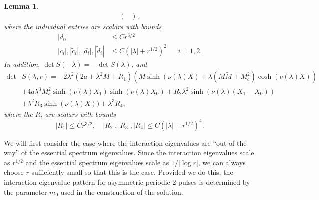 \documentclass[12pt]{elsarticle}
\theoremstyle{plain}
\newtheorem{lemma}[theorem]{Lemma}
\theoremstyle{definition}
\theoremstyle{remark}
\numberwithin{theorem}{section}
\numberwithin{equation}{section}
\begin{document}
\begin{lemma}
\begin{align}
\begin{pmatrix}
\end{pmatrix},
\end{align}
where the individual entries are scalars with bounds
\begin{align*}
|d_0| &\leq C r^{3/2} \\
|c_i|, |\tilde{c}_i|, |d_i|, |\tilde{d}_i| &\leq C (|\lambda| + r^{1/2})^2 && i = 1, 2.
\end{align*}
In addition, $\det S(-\lambda) = -\det S(\lambda)$, and 
\begin{equation}\label{2pblockmatrixdet}
\begin{aligned}
\det &S(\lambda, r) = -2 \lambda^2 (2a + \lambda^2 M + R_1) \left( M \sinh(\nu(\lambda)X) + \lambda (M \tilde{M} + M_c^2 ) \cosh(\nu(\lambda)X) \right) \\
&+4 a \lambda^3 M_c^2 \sinh(\nu(\lambda)X_1)\sinh(\nu(\lambda)X_0) 
+ R_2 \lambda^2 \sinh(\nu(\lambda)(X_1 - X_0)) \\
&+ \lambda^2 R_3 \sinh(\nu(\lambda)X)) + \lambda^3 R_4,
\end{aligned}
\end{equation}
where the $R_i$ are scalars with bounds 
\begin{equation*}
|R_1| \leq C r^{3/2}, \quad |R_2|, |R_3|, |R_4| \leq C(|\lambda| + r^{1/2})^4.
\end{equation*}
\end{lemma}

We will first consider the case where the interaction eigenvalues are ``out of the way'' of the essential spectrum eigenvalues. Since the interaction eigenvalues scale as $r^{1/2}$ and the essential spectrum eigenvalues scale as $1/|\log r|$, we can always choose $r$ sufficiently small so that this is the case. Provided we do this, the interaction eigenvalue pattern for asymmetric periodic 2-pulses is determined by the parameter $m_0$ used in the construction of the solution.
\end{document}
